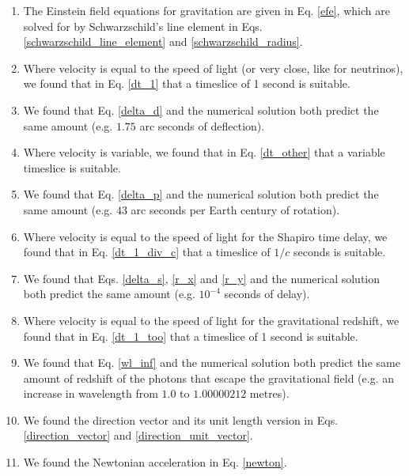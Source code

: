 \documentclass[12pt]{article}
\begin{document}
\begin{enumerate}

\item
The Einstein field equations for gravitation are given in Eq. \ref{efe}, which are solved for by Schwarzschild's line element in Eqs. \ref{schwarzschild_line_element} and \ref{schwarzschild_radius}.

\item
Where velocity is equal to the speed of light (or very close, like for neutrinos), we found that in Eq. \ref{dt_1} that a timeslice of 1 second is suitable.

\item
We found that Eq. \ref{delta_d} and the numerical solution both predict the same amount (e.g. $1.75$ arc seconds of deflection).

\item
Where velocity is variable, we found that in Eq. \ref{dt_other} that a variable timeslice is suitable.

\item
We found that Eq. \ref{delta_p} and the numerical solution both predict the same amount (e.g. $43$ arc seconds per Earth century of rotation).

\item
Where velocity is equal to the speed of light for the Shapiro time delay, we found that in Eq. \ref{dt_1_div_c} that a timeslice of $1/c$ seconds is suitable.

\item 
We found that Eqs. \ref{delta_s}, \ref{r_x} and \ref{r_y} and the numerical solution both predict the same amount (e.g. $10^{-4}$ seconds of delay).

\item
Where velocity is equal to the speed of light for the gravitational redshift, we found that in Eq. \ref{dt_1_too} that a timeslice of 1 second is suitable.

\item
We found that Eq. \ref{wl_inf} and the numerical solution both predict the same amount of redshift of the photons that escape the gravitational field (e.g. an increase in wavelength from $1.0$ to $1.00000212$ metres).

\item
We found the direction vector and its unit length version in Eqs. \ref{direction_vector} and \ref{direction_unit_vector}.

\item
We found the Newtonian acceleration in Eq. \ref{newton}.


\end{enumerate}
\end{document}
